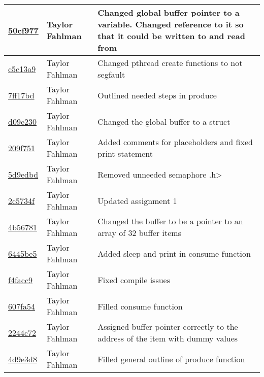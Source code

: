 \begin{tabular}{l l l}
\href{https://github.com/fahlmant/cs444/commit/50cf97754d7e3aa081ef30f56af307d2671969ff}{50cf977} & Taylor Fahlman & Changed global buffer pointer to a variable. Changed reference to it so that it could be written to and read from\\\hline
\href{https://github.com/fahlmant/cs444/commit/c5c13a973ba6f8363baf95b9e2330ea4dca16651}{c5c13a9} & Taylor Fahlman & Changed pthread create functions to not segfault\\\hline
\href{https://github.com/fahlmant/cs444/commit/7ff17bdada1706eb1057ba678bde47c8f5b18774}{7ff17bd} & Taylor Fahlman & Outlined needed steps in produce\\\hline
\href{https://github.com/fahlmant/cs444/commit/d09e23095844c4b70beb8f084938a6716eb11f24}{d09e230} & Taylor Fahlman & Changed the global buffer to a struct\\\hline
\href{https://github.com/fahlmant/cs444/commit/209f7513f40020a3ae61565dd7f115b7c72b8472}{209f751} & Taylor Fahlman & Added comments for placeholders and fixed print statement\\\hline
\href{https://github.com/fahlmant/cs444/commit/5d9edbd4229b7263d39225f1ec581258af623a3d}{5d9edbd} & Taylor Fahlman & Removed unneeded semaphore .h>\\\hline
\href{https://github.com/fahlmant/cs444/commit/2c5734f5d2cbbf0650eefb5acbf3da30c458f406}{2c5734f} & Taylor Fahlman & Updated assignment 1\\\hline
\href{https://github.com/fahlmant/cs444/commit/4b56781b7d05dd3c5653e92d8b3bfe43374a4190}{4b56781} & Taylor Fahlman & Changed the buffer to be a pointer to an array of 32 buffer items\\\hline
\href{https://github.com/fahlmant/cs444/commit/6445be50d9acb170ec3adaa80fe9418b160faf23}{6445be5} & Taylor Fahlman & Added sleep and print in consume function\\\hline
\href{https://github.com/fahlmant/cs444/commit/f4facc9d5a16eb42168ac97078b0f487a08a407c}{f4facc9} & Taylor Fahlman & Fixed compile issues\\\hline
\href{https://github.com/fahlmant/cs444/commit/607fa54aeb02833e23feaaebe3ca42504e86a20c}{607fa54} & Taylor Fahlman & Filled consume function\\\hline
\href{https://github.com/fahlmant/cs444/commit/2244c720455b015276a94f97610bd3e710e41705}{2244c72} & Taylor Fahlman & Assigned buffer pointer correctly to the address of the item with dummy values\\\hline
\href{https://github.com/fahlmant/cs444/commit/4d9e3d84c0309caf5af3ca5aed2af08010b2ef85}{4d9e3d8} & Taylor Fahlman & Filled general outline of produce function\\\hline

\end{tabular}
